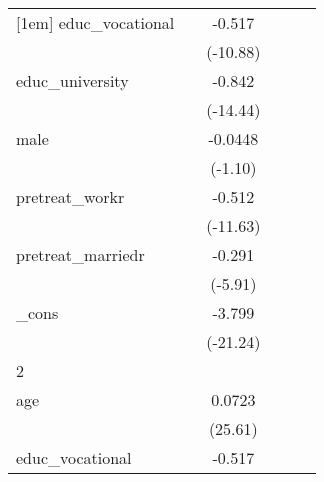 {\begin{tabular}{l*{5}{c}}
[1em]
educ\_vocational&                     &      -0.517\sym{***}&                     &                     &                     \\
            &                     &    (-10.88)         &                     &                     &                     \\
[1em]
educ\_university&                     &      -0.842\sym{***}&                     &                     &                     \\
            &                     &    (-14.44)         &                     &                     &                     \\
[1em]
male        &                     &     -0.0448         &                     &                     &                     \\
            &                     &     (-1.10)         &                     &                     &                     \\
[1em]
pretreat\_workr&                     &      -0.512\sym{***}&                     &                     &                     \\
            &                     &    (-11.63)         &                     &                     &                     \\
[1em]
pretreat\_marriedr&                     &      -0.291\sym{***}&                     &                     &                     \\
            &                     &     (-5.91)         &                     &                     &                     \\
[1em]
\_cons      &                     &      -3.799\sym{***}&                     &                     &                     \\
            &                     &    (-21.24)         &                     &                     &                     \\
\hline
2           &                     &                     &                     &                     &                     \\
age         &                     &      0.0723\sym{***}&                     &                     &                     \\
            &                     &     (25.61)         &                     &                     &                     \\
[1em]
educ\_vocational&                     &      -0.517\sym{***}&                     &                     &                     \\

\end{tabular}}
